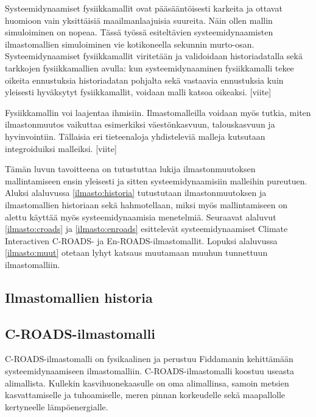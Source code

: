 \documentclass[finnish,12pt,a4paper,pdftex]{article}
\begin{document}
\begin{onehalfspacing}
Systeemidynaamiset fysiikkamallit ovat pääsääntöisesti karkeita ja ottavat huomioon vain yksittäisiä maailmanlaajuisia suureita. Näin ollen mallin simuloiminen on nopeaa. Tässä työssä esiteltävien systeemidynaamisten ilmastomallien simuloiminen vie kotikoneella sekunnin murto-osan. Systeemidynaamiset fysiikkamallit viritetään ja validoidaan historiadatalla sekä tarkkojen fysiikkamallien avulla: kun systeemidynaaminen fysiikkamalli tekee oikeita ennustuksia historiadatan pohjalta sekä vastaavia ennustuksia kuin yleisesti hyväksytyt fysiikkamallit, voidaan malli katsoa oikeaksi. [viite]

Fysiikkamallin voi laajentaa ihmisiin. Ilmastomalleilla voidaan myös tutkia, miten ilmastonmuutos vaikuttaa esimerkiksi väestönkasvuun, talouskasvuun ja hyvinvointiin. Tällaisia eri tieteenaloja yhdisteleviä malleja kutsutaan integroiduiksi malleiksi. [viite]

Tämän luvun tavoitteena on tutustuttaa lukija ilmastonmuutoksen mallintamiseen ensin yleisesti ja sitten systeemidynaamisiin malleihin pureutuen. Aluksi alaluvussa \ref{ilmasto:historia} tutustutaan ilmastonmuutoksen ja ilmastomallien historiaan sekä hahmotellaan, miksi myös mallintamiseen on alettu käyttää myös systeemidynaamisia menetelmiä. Seuraavat alaluvut \ref{ilmasto:croads} ja \ref{ilmasto:enroads} esittelevät systeemidynaamiset Climate Interactiven C-ROADS- ja En-ROADS-ilmastomallit. Lopuksi alaluvussa \ref{ilmasto:muut} otetaan lyhyt katsaus muutamaan muuhun tunnettuun ilmastomalliin. 

\subsection{Ilmastomallien historia \label{ilmasto:historia}}


\subsection{C-ROADS-ilmastomalli \label{ilmasto:croads}}

C-ROADS-ilmastomalli on fysikaalinen ja perustuu Fiddamanin \cite{Fiddaman1997} kehittämään systeemidynaamiseen ilmastomalliin. C-ROADS-ilmastomalli koostuu useasta alimallista. Kullekin kasvihuonekaasulle on oma alimallinsa, samoin metsien kasvattamiselle ja tuhoamiselle, meren pinnan korkeudelle sekä maapallolle kertyneelle lämpöenergialle. \cite{croads}


\end{onehalfspacing}
\end{document}
